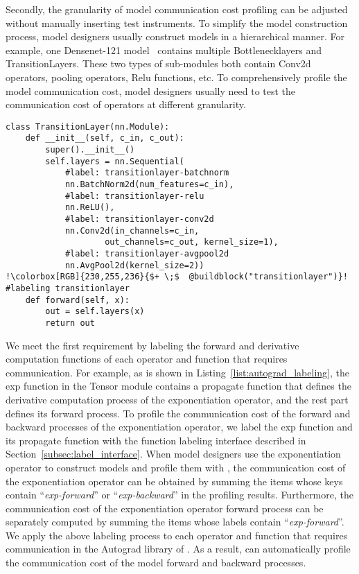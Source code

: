 Secondly, the granularity of model communication cost profiling can be adjusted without manually inserting test instruments. To simplify the model construction process, model designers usually construct models in a hierarchical manner. For example, one Densenet-121 model~\cite{Huang_2017_CVPR} contains multiple Bottlenecklayers and TransitionLayers. These two types of sub-modules both contain Conv2d operators, pooling operators, Relu functions, etc. To comprehensively profile the model communication cost, model designers usually need to test the communication cost of operators at different granularity. 

\begin{lstlisting}[escapechar=!,mathescape,xleftmargin=2em,framexleftmargin=2em, caption = {An example of labeling the forward functions of sub-modules to adjust the granularity of model communication cost profiling. The newly added labeling codes are highlighted on a green background and labeled with a plus sign at the beginning of the line.},columns=fullflexible, label = {list:component_labeling}]
class TransitionLayer(nn.Module):
    def __init__(self, c_in, c_out):
        super().__init__()
        self.layers = nn.Sequential(
            #label: transitionlayer-batchnorm
            nn.BatchNorm2d(num_features=c_in),
            #label: transitionlayer-relu
            nn.ReLU(),
            #label: transitionlayer-conv2d
            nn.Conv2d(in_channels=c_in, 
                    out_channels=c_out, kernel_size=1),
            #label: transitionlayer-avgpool2d
            nn.AvgPool2d(kernel_size=2))
!\colorbox[RGB]{230,255,236}{$+ \;$  @buildblock("transitionlayer")}! #labeling transitionlayer
    def forward(self, x):
        out = self.layers(x)
        return out
\end{lstlisting}


We meet the first requirement by labeling the forward and derivative computation functions of each operator and function that requires communication. For example, as is shown in Listing~\ref{list:autograd_labeling}, the exp function in the Tensor module contains a propagate function that defines the derivative computation process of the exponentiation operator, and the rest part defines its forward process. To profile the communication cost of the forward and backward processes of the exponentiation operator, we label the exp function and its propagate function with the function labeling interface described in Section~\ref{subsec:label_interface}. When model designers use the exponentiation operator to construct models and profile them with \hawkeye, the communication cost of the exponentiation operator can be obtained by summing the items whose keys contain ``\textit{exp-forward}'' or ``\textit{exp-backward}'' in the profiling results. Furthermore, the communication cost of the exponentiation operator forward process can be separately computed by summing the items whose labels contain ``\textit{exp-forward}''. We apply the above labeling process to each operator and function that requires communication in the Autograd library of \hawkeye. As a result, \hawkeye can automatically profile the communication cost of the model forward and backward processes.



